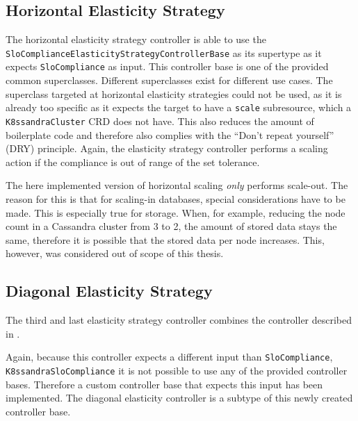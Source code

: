 \subsection{Horizontal Elasticity Strategy}
\label{sec:horizontal-elasticity}

The horizontal elasticity strategy controller is able to use the \texttt{Slo\-Compliance\-E\-las\-tic\-i\-ty\-Strategy\-Controller\-Base} as its supertype as it expects \texttt{Slo\-Compliance} as input. This controller base is one of the provided common superclasses. Different superclasses exist for different use cases. The superclass targeted at horizontal elasticity strategies could not be used, as it is already too specific as it expects the target to have a \texttt{scale} subresource, which a \texttt{K8ssandraCluster} CRD does not have. This also reduces the amount of boilerplate code and therefore also complies with the ``Don't repeat yourself'' (DRY) principle. Again, the elasticity strategy controller performs a scaling action if the compliance is out of range of the set tolerance.

The here implemented version of horizontal scaling \textit{only} performs scale-out. The reason for this is that for scaling-in databases, special considerations have to be made. This is especially true for storage. When, for example, reducing the node count in a Cassandra cluster from 3 to 2, the amount of stored data stays the same, therefore it is possible that the stored data per node increases. This, however, was considered out of scope of this thesis.

\subsection{Diagonal Elasticity Strategy}
\label{sec:diagonal-elasticity}

The third and last elasticity strategy controller combines the controller described in .

Again, because this controller expects a different input than \texttt{SloCompliance}, \texttt{K8\-ssan\-dra\-Slo\-Compliance} it is not possible to use any of the provided controller bases. Therefore a custom controller base that expects this input has been implemented. The diagonal elasticity controller is a subtype of this newly created controller base.

